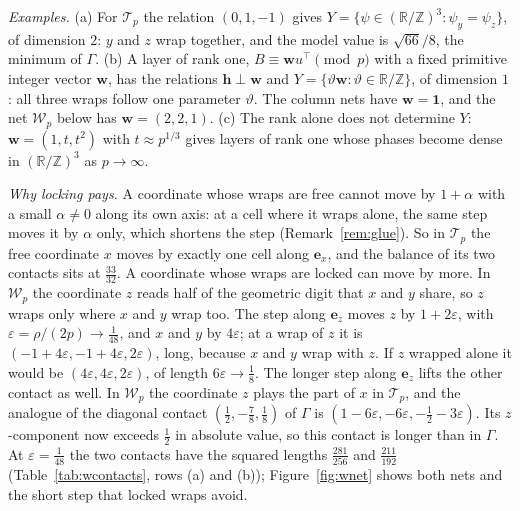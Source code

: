 \documentclass[11pt]{amsart}
\theoremstyle{definition}
\theoremstyle{plain}
\newcommand{\Z}{\mathbb{Z}}
\newcommand{\e}{\mathbf{e}}
\providecommand{\R}{\mathbb{R}}
\begin{document}
\emph{Examples.} (a) For $\mathcal T_p$ the relation $(0,1,-1)$ gives $Y=\{\psi\in(\R/\Z)^3:\psi_y=\psi_z\}$, of dimension $2$: $y$ and $z$ wrap together, and the model value is $\sqrt{66}/8$, the minimum of $\Gamma$. (b) A layer of rank one, $B\equiv\mathbf w u^{\!\top}\pmod p$ with a fixed primitive integer vector $\mathbf w$, has the relations $\mathbf h\perp\mathbf w$ and $Y=\{\vartheta\mathbf w:\vartheta\in\R/\Z\}$, of dimension $1$: all three wraps follow one parameter $\vartheta$. The column nets have $\mathbf w=\mathbf 1$, and the net $\mathcal W_p$ below has $\mathbf w=(2,2,1)$. (c) The rank alone does not determine $Y$: $\mathbf w=(1,t,t^2)$ with $t\approx p^{1/3}$ gives layers of rank one whose phases become dense in $(\R/\Z)^3$ as $p\to\infty$.

\emph{Why locking pays.} A coordinate whose wraps are free cannot move by $1+\alpha$ with a small $\alpha\ne0$ along its own axis: at a cell where it wraps alone, the same step moves it by $\alpha$ only, which shortens the step (Remark~\ref{rem:glue}). So in $\mathcal T_p$ the free coordinate $x$ moves by exactly one cell along $\e_x$, and the balance of its two contacts sits at $\frac{33}{32}$. A coordinate whose wraps are locked can move by more. In $\mathcal W_p$ the coordinate $z$ reads half of the geometric digit that $x$ and $y$ share, so $z$ wraps only where $x$ and $y$ wrap too. The step along $\e_z$ moves $z$ by $1+2\varepsilon$, with $\varepsilon=\rho/(2p)\to\frac1{48}$, and $x$ and $y$ by $4\varepsilon$; at a wrap of $z$ it is $(-1+4\varepsilon,-1+4\varepsilon,2\varepsilon)$, long, because $x$ and $y$ wrap with $z$. If $z$ wrapped alone it would be $(4\varepsilon,4\varepsilon,2\varepsilon)$, of length $6\varepsilon\to\frac18$. The longer step along $\e_z$ lifts the other contact as well. In $\mathcal W_p$ the coordinate $z$ plays the part of $x$ in $\mathcal T_p$, and the analogue of the diagonal contact $(\frac12,-\frac78,\frac18)$ of $\Gamma$ is $(1-6\varepsilon,-6\varepsilon,-\frac12-3\varepsilon)$. Its $z$-component now exceeds $\frac12$ in absolute value, so this contact is longer than in $\Gamma$. At $\varepsilon=\frac1{48}$ the two contacts have the squared lengths $\frac{281}{256}$ and $\frac{211}{192}$ (Table~\ref{tab:wcontacts}, rows (a) and (b)); Figure~\ref{fig:wnet} shows both nets and the short step that locked wraps avoid.
\end{document}

